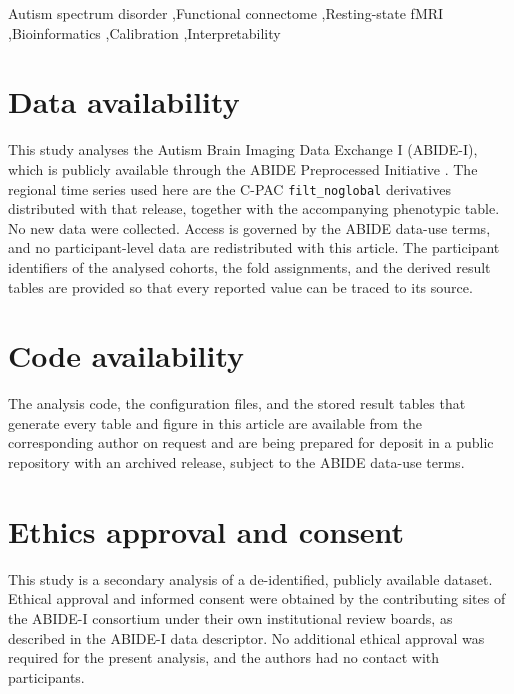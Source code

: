 \documentclass[a4paper,fleqn]{cas-sc}
\begin{document}
\begin{keywords}
Autism spectrum disorder \sep Functional connectome \sep Resting-state fMRI \sep Bioinformatics \sep Calibration \sep Interpretability
\end{keywords}

\maketitle   








\section*{Data availability}
This study analyses the Autism Brain Imaging Data Exchange I (ABIDE-I), which is publicly available through
the ABIDE Preprocessed Initiative \cite{ABIDE_preprocessed_dataset}. The regional time series used here are the
C-PAC \texttt{filt\_noglobal} derivatives distributed with that release, together with the accompanying phenotypic
table. No new data were collected. Access is governed by the ABIDE data-use terms, and no participant-level data are
redistributed with this article. The participant identifiers of the analysed cohorts, the fold assignments, and the derived
result tables are provided so that every reported value can be traced to its source.

\section*{Code availability}
The analysis code, the configuration files, and the stored result tables that generate every
table and figure in this article are available from the corresponding author on request and are
being prepared for deposit in a public repository with an archived release, subject to the
ABIDE data-use terms.

\section*{Ethics approval and consent}
This study is a secondary analysis of a de-identified, publicly available dataset. Ethical
approval and informed consent were obtained by the contributing sites of the ABIDE-I
consortium under their own institutional review boards, as described in the ABIDE-I data
descriptor. No additional ethical approval was required for the present analysis, and the
authors had no contact with participants.
\end{document}

